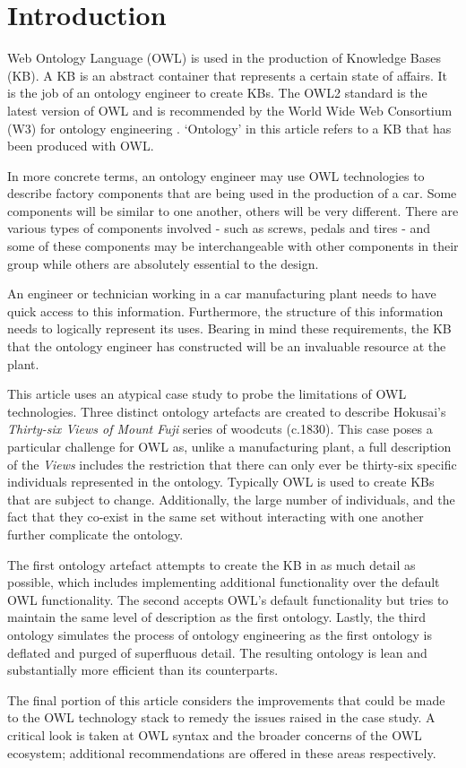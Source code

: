 \documentclass[titlepage,a4paper,12pt,oneside]{book}
\begin{document}
\chapter{Introduction}
Web Ontology Language (OWL) is used in the production of Knowledge Bases (KB).
A KB is an abstract container that represents a certain state of affairs.
It is the job of an ontology engineer to create KBs.
The OWL2 standard is the latest version of OWL and is recommended by the World Wide Web Consortium (W3) for ontology engineering \cite[22]{introduction2011}.
`Ontology' in this article refers to a KB that has been produced with OWL.\par
In more concrete terms, an ontology engineer may use OWL technologies to describe factory components that are being used in the production of a car.
Some components will be similar to one another, others will be very different.
There are various types of components involved - such as screws, pedals and tires - and some of these components may be interchangeable with other components in their group while others are absolutely essential to the design.\par
An engineer or technician working in a car manufacturing plant needs to have quick access to this information.
Furthermore, the structure of this information needs to logically represent its uses.
Bearing in mind these requirements, the KB that the ontology engineer has constructed will be an invaluable resource at the plant.\par
This article uses an atypical case study to probe the limitations of OWL technologies.
Three distinct ontology artefacts are created to describe Hokusai's \textit{Thirty-six Views of Mount Fuji} series of woodcuts (c.1830).
This case poses a particular challenge for OWL as, unlike a manufacturing plant, a full description of the \textit{Views} includes the restriction that there can only ever be thirty-six specific individuals represented in the ontology.
Typically OWL is used to create KBs that are subject to change.
Additionally, the large number of individuals, and the fact that they co-exist in the same set without interacting with one another further complicate the ontology.\par
The first ontology artefact attempts to create the KB in as much detail as possible, which includes implementing additional functionality over the default OWL functionality.
The second accepts OWL's default functionality but tries to maintain the same level of description as the first ontology.
Lastly, the third ontology simulates the process of ontology engineering as the first ontology is deflated and purged of superfluous detail.
The resulting ontology is lean and substantially more efficient than its counterparts.\par
The final portion of this article considers the improvements that could be made to the OWL technology stack to remedy the issues raised in the case study.
A critical look is taken at OWL syntax and the broader concerns of the OWL ecosystem; additional recommendations are offered in these areas respectively.
\end{document}
